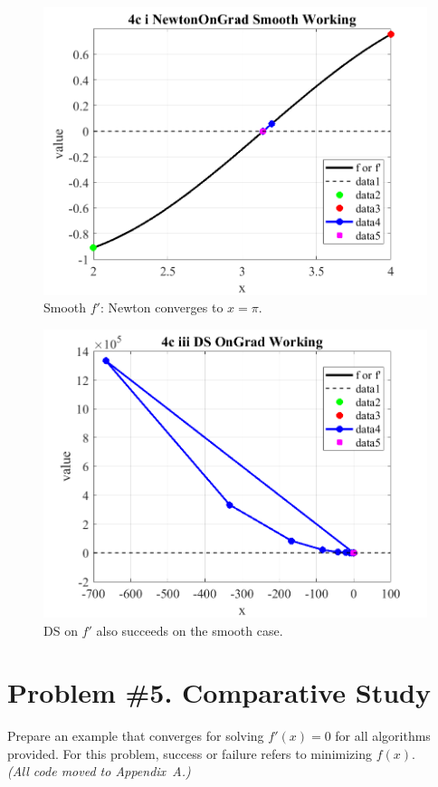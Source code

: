 \documentclass[11pt]{article}
\begin{document}
\begin{enumerate}[label=4(\alph*)]
		\begin{figure}[H]\centering
			\includegraphics[width=0.78\linewidth]{plots/4c_i_NewtonOnGrad_Smooth_Working.png}
			\caption{Smooth \(f'\): Newton converges to \(x=\pi\).}
		\end{figure}
		\begin{figure}[H]\centering
			\includegraphics[width=0.78\linewidth]{plots/4c_iii_DS_OnGrad_Working.png}
			\caption{DS on \(f'\) also succeeds on the smooth case.}
		\end{figure}
		
	\end{enumerate}
	
	\newpage
	\section*{Problem \#5. Comparative Study}
	
	Prepare an example that converges for solving $f'(x)=0$ for all algorithms provided. For this problem, success or failure refers to minimizing $f(x)$.\\
	\emph{(All code moved to Appendix~A.)}
	
\end{document}
